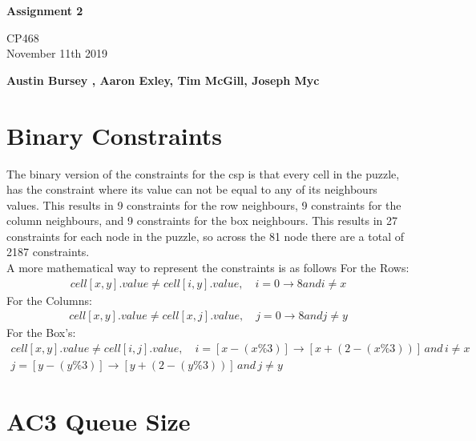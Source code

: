 \documentclass{article}
\begin{document}
\begin{titlepage}
  \pagestyle{fancy}
  \thispagestyle{fancy}
   \begin{center}
       \vspace*{1cm}
 
      \Huge
       \textbf{Assignment 2}
 
       \vspace{0.5cm}
       \Large
        CP468 \\ November 11th 2019
 
       \vspace{1.5cm}
 
       \textbf{Austin Bursey , Aaron Exley, Tim McGill, Joseph Myc}
 
       \vfill

       \vspace{0.8cm}
 
   \end{center}
\end{titlepage}
\setcounter{page}{2}

\section{Binary Constraints}
The binary version of the constraints for the csp is that every cell in the puzzle, has the constraint where its value can not be equal to any of its neighbours  values. This results in 9 constraints for the row neighbours, 9 constraints for the column neighbours, and 9 constraints for the box neighbours. This results in 27 constraints for each node in the puzzle, so across the 81 node there are a total of 2187 constraints.\\
\newline
A more mathematical way to represent the constraints is as follows
For the Rows:
\begin{align*}
cell[x, y].value \ne cell[i, y].value,\quad i=0\rightarrow8 and i \ne x
\end{align*}
For the Columns:
\begin{align*}
cell[x, y].value \ne cell[x, j].value,\quad j=0\rightarrow8 and j \ne y
\end{align*}
For the Box's:
\begin{align*}
cell[x, y].value \ne cell[i, j].value,\quad i=[x-(x\%3)]\rightarrow[x+(2-(x\%3))]\,and\, i \ne x \\
												j=[y-(y\%3)]\rightarrow[y+(2-(y\%3))]\, and\, j \ne y
\end{align*}
\section{AC3 Queue Size}
\end{document}
